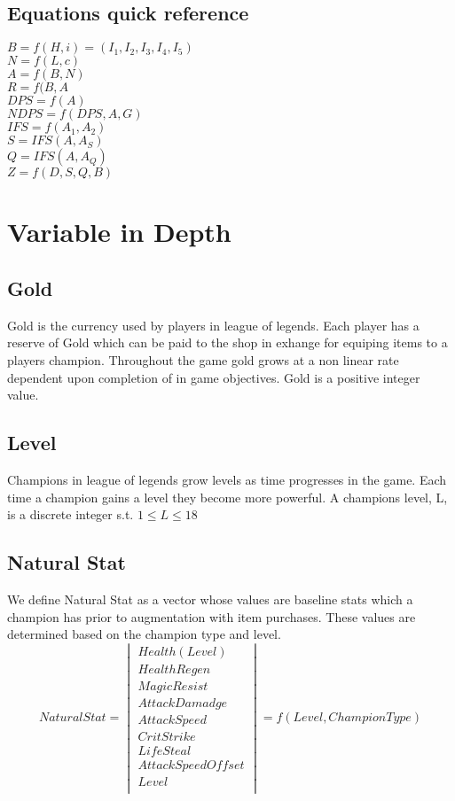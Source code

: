 \documentclass{article}
\begin{document}
\subsection{Equations quick reference}
$B = f(H,i)=(I_1,I_2,I_3,I_4,I_5)$\\
$N = f(L, c)$\\
$A = f(B,N)$\\
$R=f(B,A$\\
$DPS = f(A)$\\
$NDPS = f(DPS,A,G)$\\
$IFS = f(A_1, A_2)$\\
$S = IFS(A,A_S)$\\
$Q = IFS(A, A_Q)$\\
$Z = f(D,S,Q,B)$\\

\newpage

\section{Variable in Depth}
\subsection{Gold}
Gold is the currency used by players in league of legends.  Each player has a reserve of Gold which can be paid to the shop in exhange for equiping items to a players champion.  Throughout the game gold grows at a non linear rate dependent upon completion of in game objectives.  Gold is a positive integer value.
\subsection{Level}
Champions in league of legends grow levels as time progresses in the game. Each time a champion gains a level they become more powerful.  A champions level, L, is a discrete integer s.t. $1\leq L \leq 18 $
\subsection{Natural Stat}
We define Natural Stat as a vector whose values are baseline stats which a champion has prior to augmentation with item purchases.   These values are determined based on the champion type and level.  
\begin{equation}
Natural Stat = 
\begin{vmatrix}
	Health(Level)\\
	Health Regen\\
	Magic Resist \\
	Attack Damadge \\
	Attack Speed \\
	Crit Strike \\
	Life Steal \\
	Attack Speed Offset\\
	Level \\
\end{vmatrix} = f(Level, Champion Type)
\end{equation}
\end{document}
